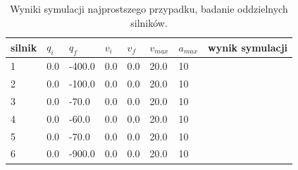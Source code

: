 \documentclass[a4paper, 12pt]{article}
\begin{document}
	\begin{table}[H]
	\centering
	\begin{tabular}{|m{2.5em}|m{4em}|m{4em}|m{4em}|m{4em}|m{4em}|m{4em}|m{5em}|}
	\hline
	silnik&$ q_i $ & $ q_f $ & $ v_i $ & $ v_f $ & $ v_{max} $ & $ a_{max} $&wynik symulacji\\
	\hline
	\hline
	\hspace{1em}1& 0.0 & -400.0 & 0.0 & 0.0 & 20.0 & 10&\hspace{2em}\checkmark\\ %
	\hline
	\hspace{1em}2& 0.0 & -100.0 & 0.0 & 0.0 & 20.0 & 10&\hspace{2em}\checkmark\\ %
	\hline
	\hspace{1em}3& 0.0 & -70.0 & 0.0 & 0.0 & 20.0 & 10&\hspace{2em}\checkmark\\ %
	\hline
	\hspace{1em}4& 0.0 & -60.0 & 0.0 & 0.0 & 20.0 & 10&\hspace{2em}\checkmark\\  %
	\hline
	\hspace{1em}5& 0.0 & -70.0 & 0.0 & 0.0 & 20.0 & 10&\hspace{2em}\checkmark\\  %
	\hline
	\hspace{1em}6& 0.0 & -900.0 & 0.0 & 0.0 & 20.0 & 10&\hspace{2em}\checkmark\\  %
	\hline
	\end{tabular}
	\caption{Wyniki symulacji najprostszego przypadku, badanie oddzielnych silników.}
	\label{tab:setup10}
	\end{table}
	
\end{document}
